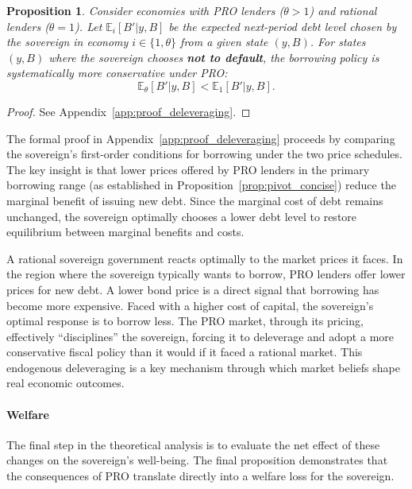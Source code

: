 \documentclass[12pt]{article}
\theoremstyle{plain}
\newtheorem{proposition}{Proposition}
\begin{document}
\begin{proposition}
	\label{prop:deleveraging}
	Consider economies with PRO lenders ($\theta > 1$) and rational lenders ($\theta = 1$). Let $\mathbb{E}_i[B'|y, B]$ be the expected next-period debt level chosen by the sovereign in economy $i \in \{1, \theta\}$ from a given state $(y, B)$. For states $(y, B)$ where the sovereign chooses \textbf{not to default}, the borrowing policy is systematically more conservative under PRO:
	\begin{equation*}
		\mathbb{E}_\theta[B'|y, B] < \mathbb{E}_1[B'|y, B].
	\end{equation*}
\end{proposition}

\begin{proof}
	See Appendix~\ref{app:proof_deleveraging}.
\end{proof}

The formal proof in Appendix~\ref{app:proof_deleveraging} proceeds by comparing
the sovereign's first-order conditions for borrowing under the two price
schedules. The key insight is that lower prices offered by PRO lenders in the
primary borrowing range (as established in
Proposition~\ref{prop:pivot_concise}) reduce the marginal benefit of issuing
new debt. Since the marginal cost of debt remains unchanged, the sovereign
optimally chooses a lower debt level to restore equilibrium between marginal
benefits and costs.

A rational sovereign government reacts optimally to the market prices it faces.
In the region where the sovereign typically wants to borrow, PRO lenders offer
lower prices for new debt. A lower bond price is a direct signal that borrowing
has become more expensive. Faced with a higher cost of capital, the sovereign's
optimal response is to borrow less. The PRO market, through its pricing,
effectively ``disciplines'' the sovereign, forcing it to deleverage and adopt a
more conservative fiscal policy than it would if it faced a rational market.
This endogenous deleveraging is a key mechanism through which market beliefs
shape real economic outcomes.

\paragraph{Welfare}
The final step in the theoretical analysis is to evaluate the net effect of
these changes on the sovereign's well-being. The final proposition demonstrates
that the consequences of PRO translate directly into a welfare loss for the
sovereign.
\end{document}
